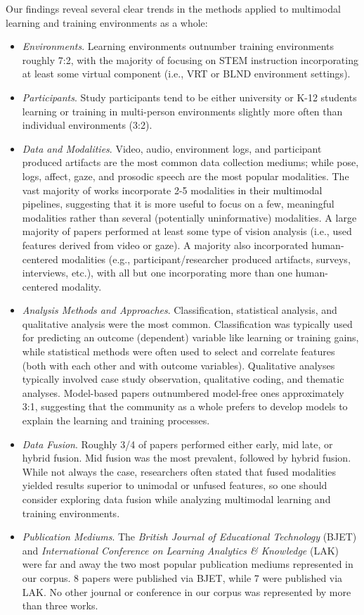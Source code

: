 \documentclass[manuscript,screen,review]{acmart}
\begin{document}
Our findings reveal several clear trends in the methods applied to multimodal learning and training environments as a whole:
\begin{itemize}
    \item \textit{Environments}. Learning environments outnumber training environments roughly 7:2, with the majority of focusing on STEM instruction incorporating at least some virtual component (i.e., VRT or BLND environment settings).
    \item \textit{Participants}. Study participants tend to be either university or K-12 students learning or training in multi-person environments slightly more often than individual environments (3:2).
    \item \textit{Data and Modalities}. Video, audio, environment logs, and participant produced artifacts are the most common data collection mediums; while pose, logs, affect, gaze, and prosodic speech are the most popular modalities. The vast majority of works incorporate 2-5 modalities in their multimodal pipelines, suggesting that it is more useful to focus on a few, meaningful modalities rather than several (potentially uninformative) modalities. A large majority of papers performed at least some type of vision analysis (i.e., used features derived from video or gaze). A majority also incorporated human-centered modalities (e.g., participant/researcher produced artifacts, surveys, interviews, etc.), with all but one incorporating more than one human-centered modality.
    \item \textit{Analysis Methods and Approaches}. Classification, statistical analysis, and qualitative analysis were the most common. Classification was typically used for predicting an outcome (dependent) variable like learning or training gains, while statistical methods were often used to select and correlate features (both with each other and with outcome variables). Qualitative analyses typically involved case study observation, qualitative coding, and thematic analyses. Model-based papers outnumbered model-free ones approximately 3:1, suggesting that the community as a whole prefers to develop models to explain the learning and training processes.
    \item \textit{Data Fusion}. Roughly 3/4 of papers performed either early, mid late, or hybrid fusion. Mid fusion was the most prevalent, followed by hybrid fusion. While not always the case, researchers often stated that fused modalities yielded results superior to unimodal or unfused features, so one should consider exploring data fusion while analyzing multimodal learning and training environments. 
    \item  \textit{Publication Mediums}. The \textit{British Journal of Educational Technology} (BJET) and \textit{International Conference on Learning Analytics \& Knowledge} (LAK) were far and away the two most popular publication mediums represented in our corpus. 8 papers were published via BJET, while 7 were published via LAK. No other journal or conference in our corpus was represented by more than three works.
\end{itemize}
\end{document}
